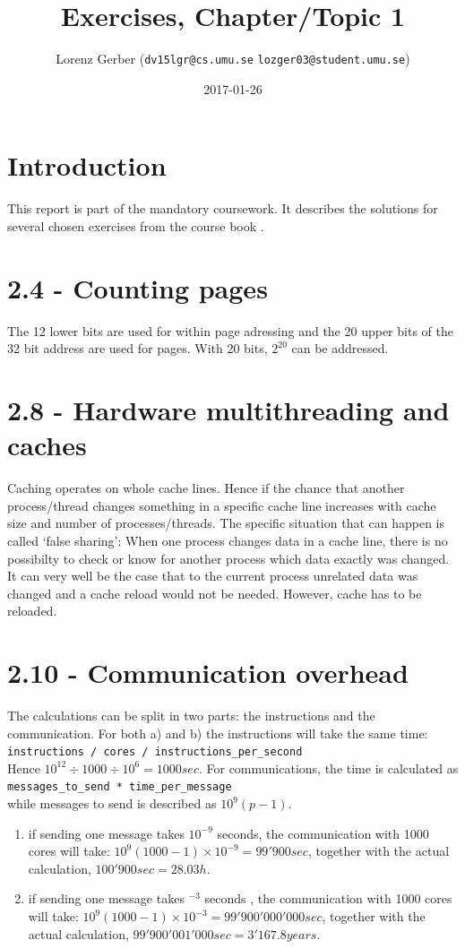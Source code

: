 \documentclass[a4paper,11pt,twoside]{article}
\title{Exercises, Chapter/Topic 1}
\author{Lorenz Gerber ({\tt{dv15lgr@cs.umu.se}} {\tt{lozger03@student.umu.se}})}
\date{2017-01-26}
\begin{document}
\lstset{language=C}
\maketitle
\thispagestyle{empty}
\newpage
\tableofcontents
\thispagestyle{empty}
\newpage

\clearpage
{}

\section{Introduction}
This report is part of the mandatory coursework. It describes the solutions for several chosen exercises from the course book \cite{pacheco2011}.
\section{2.4 - Counting pages}
The 12 lower bits are used for within page adressing and the 20 upper bits of the 32 bit address are used for pages. With 20 bits, $2^{20}$ can be addressed. 
\section{2.8 - Hardware multithreading and caches}
Caching operates on whole cache lines. Hence if the chance that another process/thread changes something in a specific cache line increases with cache size and number of processes/threads. The specific situation that can happen is called `false sharing': When one process changes data in a cache line, there is no possibilty to check or know for another process which data exactly was changed. It can very well be the case that to the current process unrelated data was changed and a cache reload would not be needed. However, cache has to be reloaded. 
\section{2.10 - Communication overhead}
The calculations can be split in two parts: the instructions and the communication. For both a) and b) the instructions will take the same time:\\
\verb+instructions / cores / instructions_per_second+\\
Hence $10^{12} \div 1000 \div 10^{6} = 1000 sec$. For communications, the time is calculated as\\
\verb+messages_to_send * time_per_message+\\
while messages to send is described as $10^{9}(p-1)$. 
\begin{enumerate}[label={\alph*)}]
\item if sending one message takes $10^{-9}$ seconds, the communication with 1000 cores will take: $10^{9}(1000-1) \times 10^{-9} = 99'900 sec$, together with the actual calculation, $100'900 sec = 28.03h$.
\item if sending one message takes $^{-3}$ seconds , the communication with 1000 cores will take: $10^{9}(1000-1) \times 10^{-3} = 99'900'000'000 sec$, together with the actual calculation, $99'900'001'000 sec = 3'167.8 years$.
\end{enumerate}
\end{document}
